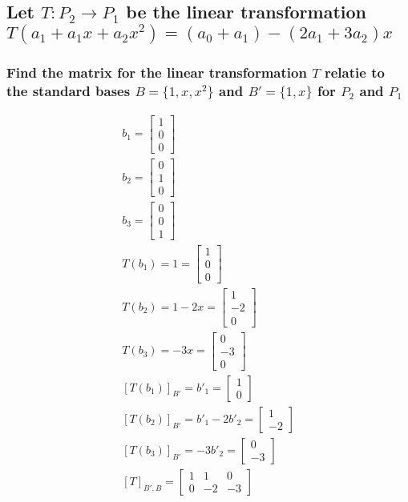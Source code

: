 \documentclass[12pt, a4paper]{article}
\begin{document}
		\subsection{Let $T:P_2\rightarrow P_1$ be the linear transformation $T(a_1+a_1x+a_2x^2)=(a_0+a_1)-(2a_1+3a_2)x$}
			\subsubsection{Find the matrix for the linear transformation $T$ relatie to the standard bases $B=\{1,x,x^2\}$ and $B'=\{1,x\}$ for $P_2$ and $P_1$}
				\begin{align*}
					b_1=\begin{bmatrix}1\\0\\0\end{bmatrix}\\
					b_2=\begin{bmatrix}0\\1\\0\end{bmatrix}\\
					b_3=\begin{bmatrix}0\\0\\1\end{bmatrix}\\[3mm]
					T(b_1)=1=\begin{bmatrix}1\\0\\0\end{bmatrix}\\
					T(b_2)=1-2x=\begin{bmatrix}1\\-2\\0\end{bmatrix}\\
					T(b_3)=-3x=\begin{bmatrix}0\\-3\\0\end{bmatrix}\\[3mm]
					[T(b_1)]_{B'}=b'_1=\begin{bmatrix}1\\0\end{bmatrix}\\
					[T(b_2)]_{B'}=b'_1-2b'_2=\begin{bmatrix}1\\-2\end{bmatrix}\\
					[T(b_3)]_{B'}=-3b'_2=\begin{bmatrix}0\\-3\end{bmatrix}\\[3mm]
					[T]_{B',B}=\begin{bmatrix}1&1&0\\0&-2&-3\end{bmatrix}
				\end{align*}
\end{document}
